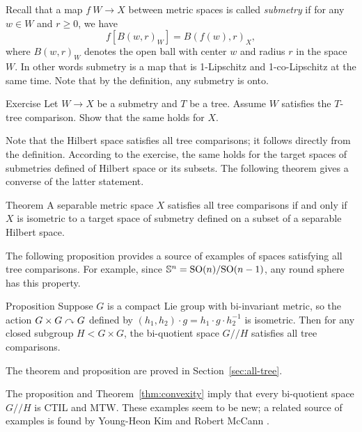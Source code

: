 Recall that a map $f\:W\to X$ between metric spaces is called \emph{submetry} if for any $w\in W$ and $r\ge 0$, we have 
\[f[B(w,r)_W]=B(f(w),r)_X,\]
where $B(w,r)_W$ denotes the open ball with center $w$ and radius $r$ in the space~$W$.
In other words submetry is a map that is 1-Lipschitz and 1-co-Lipschitz at the same time.
Note that by the definition, any submetry is onto.

\begin{thm}{Exercise}\label{ex:quotient}
Let $W\to X$ be a submetry and $T$ be a tree.
Assume $W$ satisfies the $T$-tree comparison.
Show that the same holds for $X$.
\end{thm}

Note that the Hilbert space satisfies all tree comparisons; it follows directly from the definition.
According to the exercise, the same holds for the target spaces of submetries defined of Hilbert space or its subsets.
The following theorem gives a converse of the latter statement.


\begin{thm}{Theorem}\label{thm:hilbert-quotient}
A separable metric space $X$ satisfies all tree comparisons if and only if
$X$ is isometric to a target space of submetry defined on a subset  of a separable Hilbert space.
\end{thm} %

The following proposition provides a source of examples of spaces satisfying all tree comparisons.
For example, since $\mathbb{S}^n=\mathrm{SO}(n)/\mathrm{SO}(n-1)$, any round sphere has this property.

\begin{thm}{Proposition}\label{prop:group}
Suppose $G$ is a compact Lie group with bi-invariant metric, so the action $G\times G\curvearrowright G$ defined by $(h_1,h_2)\cdot g=h_1\cdot g\cdot  h_2^{-1}$ is isometric. 
Then for any closed subgroup $H<G\times G$, the bi-quotient space $G/\!\!/H$ satisfies all tree comparisons.
\end{thm}

The theorem and proposition are proved in Section~\ref{sec:all-tree}.

The proposition and Theorem~\ref{thm:convexity} imply that every bi-quotient space $G/\!\!/H$ is CTIL and MTW.
These examples seem to be new; a related source of examples is found by Young-Heon Kim and Robert McCann \cite{kim-mccann}.

